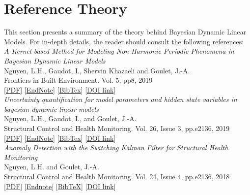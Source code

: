 \section{Reference Theory}
This section presents a summary of the theory behind Bayesian Dynamic Linear Models. For in-depth details, the reader should consult the following references:\\[4pt]

\noindent \emph{A Kernel-based Method for Modeling Non-Harmonic Periodic Phenomena in Bayesian Dynamic Linear Models}\\{\small
            Nguyen, L.H., Gaudot, I., Shervin Khazaeli and Goulet, J.-A.\\
            Frontiers in Built Environment. Vol. 5, pp8, 2019\\}
      [\href{https://www.polymtl.ca/cgm/jagoulet/Site/Papers/Nguyen_et_al_KR_BDLM_2019.pdf}{PDF}] [\href{https://www.polymtl.ca/cgm/jagoulet/Site/Papers/2019_Nguyen_BDLM_KR.enw}{EndNote}]  [\href{https://www.polymtl.ca/cgm/jagoulet/Site/Papers/2019_Nguyen_BDLM_KR.bib}{BibTex}] [\href{https://doi.org/10.3389/fbuil.2019.00008}{DOI link}] \cite{Nguyen2019KRBDLM}\\[4pt]

\noindent \emph{Uncertainty quantification for model parameters and hidden state variables in bayesian dynamic linear models}\\{\small
            Nguyen, L.H., Gaudot, I., and Goulet, J.-A.\\
            Structural Control and Health Monitoring. Vol. 26, Issue 3, pp.e2136, 2019\\}
      [\href{https://www.polymtl.ca/cgm/jagoulet/Site/Papers/Nguyen_Gaudot_Goulet_MCMC_BDLM_2018.pdf}{PDF}] [\href{https://www.polymtl.ca/cgm/jagoulet/Site/Papers/2019_Nguyen_BDLM_UC.xml}{EndNote}]  [\href{https://www.polymtl.ca/cgm/jagoulet/Site/Papers/2019_Nguyen_BDLM_UC.bib}{BibTex}] [\href{https://doi.org/10.1002/stc.2309}{DOI link}] \cite{Nguyen2018UncertaintyBDLM}\\[4pt]
      
      \noindent \emph{Anomaly Detection with the Switching Kalman Filter for Structural Health Monitoring}\\{\small
            Nguyen, L.H. and Goulet, J.-A.\\
            Structural Control and Health Monitoring. Vol. 24, Issue 4, pp.e2136, 2018\\}
      [\href{https://www.polymtl.ca/cgm/jagoulet/Site/Papers/2017_Nguyen_and_Goulet_AD-SKF.pdf}{PDF}] [\href{https://www.polymtl.ca/cgm/jagoulet/Site/Papers/Nguyen_SKF_2018.xml}{Endnote}]  [\href{https://www.polymtl.ca/cgm/jagoulet/Site/Papers/Nguyen_SKF_2018.ris}{BibTeX}] [\href{https://doi.org/10.1002/stc.2136}{DOI link}] \cite{Nguyen2018}\\[4pt]

